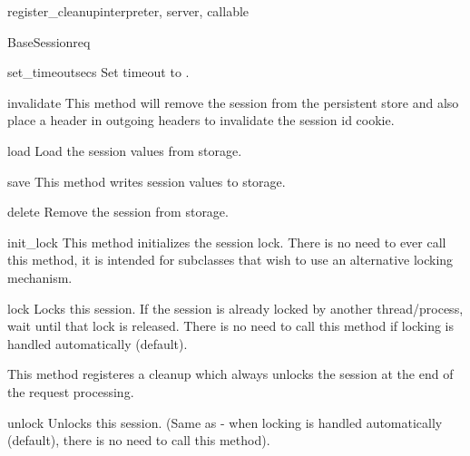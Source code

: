 \begin{funcdesc}{register_cleanup}{interpreter, server, callable}
\begin{classdesc}{BaseSession}{req}
  \begin{methoddesc}[BaseSession]{set_timeout}{secs}
    Set timeout to .
  \end{methoddesc}

  \begin{methoddesc}[BaseSession]{invalidate}{}
    This method will remove the session from the persistent store and
    also place a header in outgoing headers to invalidate the session
    id cookie.
  \end{methoddesc}

  \begin{methoddesc}[BaseSession]{load}{}
    Load the session values from storage.
  \end{methoddesc}

  \begin{methoddesc}[BaseSession]{save}{}
    This method writes session values to storage.
  \end{methoddesc}

  \begin{methoddesc}[BaseSession]{delete}{}
    Remove the session from storage.
  \end{methoddesc}

  \begin{methoddesc}[BaseSession]{init_lock}{}
    This method initializes the session lock. There is no need to ever
    call this method, it is intended for subclasses that wish to use
    an alternative locking mechanism.
  \end{methoddesc}

  \begin{methoddesc}[BaseSession]{lock}{}
    Locks this session. If the session is already locked by another
    thread/process, wait until that lock is released. There is no need
    to call this method if locking is handled automatically (default).

    This method registeres a cleanup which always unlocks the session
    at the end of the request processing.
  \end{methoddesc}

  \begin{methoddesc}[BaseSession]{unlock}{}
    Unlocks this session. (Same as  - when locking is
    handled automatically (default), there is no need to call this
    method).
  \end{methoddesc}


\end{classdesc}
\end{funcdesc}
